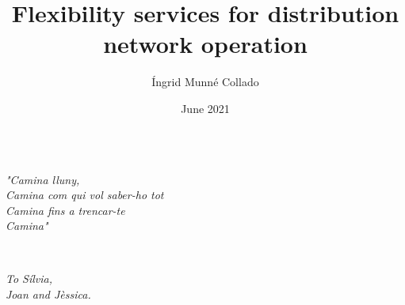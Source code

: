 \documentclass{Classe/PhDCITCEA_web}
\title{Flexibility services for distribution network operation}
\author{\'Ingrid Munn\'e Collado}
\date{June 2021}
\begin{document}
\cleardoubleemptypage


\maketitle

\cleardoubleemptypage

%

\clearpage
$ $
\\$ $
\\$ $
\\$ $
\\$ $
\\$ $
\\$ $
\\$ $
\\$ $
\\$ $
\\$ $
\\$ $
\\$ $

\begin{Large}
{\raggedleft
\textit{"Camina lluny,\\ Camina com qui vol saber-ho tot \\ Camina fins a trencar-te \\ Camina"\\}}
\vspace{2cm}

\end{Large}
\clearpage
$~$
$~$
\clearpage
$ $
\\$ $
\\$ $
\\$ $
\\$ $
\\$ $
\\$ $
\\$ $
\\$ $
\\$ $
\\$ $
\\$ $
\\$ $
\\$ $
\\$ $
\begin{Large}
	{\raggedleft
		\textit{To S\'ilvia,\\ Joan and J\`essica.\\}
		}
\end{Large}
\end{document}
